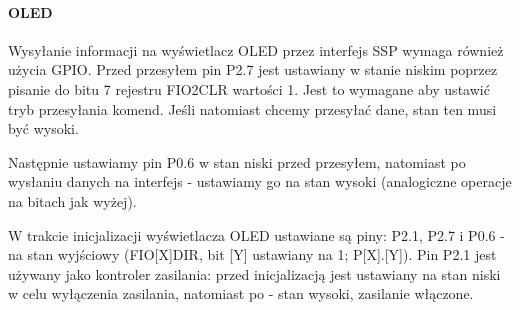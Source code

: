     \paragraph{OLED}
        
	Wysyłanie informacji na wyświetlacz OLED przez interfejs SSP wymaga
	również użycia GPIO. Przed przesyłem pin P2.7 jest ustawiany w
	stanie niskim poprzez pisanie do bitu 7 rejestru FIO2CLR
	wartości 1. Jest to wymagane aby ustawić tryb przesyłania komend.
	Jeśli natomiast chcemy przesyłać dane, stan ten musi być wysoki.

	Następnie ustawiamy pin P0.6 w stan niski przed przesyłem,
	natomiast po wysłaniu danych na interfejs - ustawiamy go na
	stan wysoki (analogiczne operacje na bitach jak wyżej).

	W trakcie inicjalizacji wyświetlacza OLED ustawiane są piny:
	P2.1, P2.7 i P0.6 - na stan wyjściowy (FIO[X]DIR, bit [Y]
	ustawiany na 1; P[X].[Y]). Pin P2.1 jest używany jako kontroler
	zasilania: przed inicjalizacją jest ustawiany na stan niski
	w celu wyłączenia zasilania, natomiast po - stan wysoki,
	zasilanie włączone.

